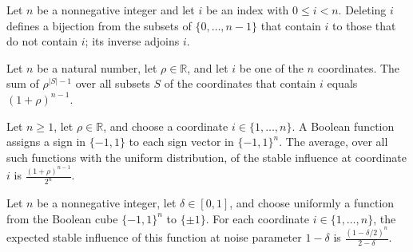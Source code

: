 \begin{definition}
\label{FABL.randomFunctionEraseContainingEquiv}
\leanok
Let $n$ be a nonnegative integer and let $i$ be an index with $0\le i<n$. Deleting $i$
defines a bijection from the subsets of $\{0,\ldots,n-1\}$ that contain $i$ to those
that do not contain $i$; its inverse adjoins $i$.
\end{definition}

\begin{theorem}
\label{FABL.sum_pow_card_sub_one_filter_mem}
\leanok
{}
Let $n$ be a natural number, let $\rho\in\mathbb R$, and let $i$ be one of the $n$
coordinates. The sum of $\rho^{|S|-1}$ over all subsets $S$ of the coordinates that
contain $i$ equals $(1+\rho)^{n-1}$.
\end{theorem}

\begin{theorem}
\label{FABL.pmfExpectation_uniformBooleanFunction_stableInfluence}
\leanok
{}
Let $n\ge 1$, let $\rho\in\mathbb{R}$, and choose a coordinate $i\in\{1,\ldots,n\}$. A
Boolean function assigns a sign in $\{-1,1\}$ to each sign vector in $\{-1,1\}^n$. The
average, over all such functions with the uniform distribution, of the stable influence
at coordinate $i$ is $\frac{(1+\rho)^{n-1}}{2^n}$.
\end{theorem}

\begin{theorem}
\label{FABL.pmfExpectation_uniformBooleanFunction_stableInfluence_one_sub}
\leanok
{}
Let $n$ be a nonnegative integer, let $\delta\in[0,1]$, and choose uniformly a function
from the Boolean cube $\{-1,1\}^n$ to $\{\pm1\}$. For each coordinate
$i\in\{1,\ldots,n\}$, the expected stable influence of this function at noise parameter
$1-\delta$ is $\frac{(1-\delta/2)^n}{2-\delta}$.
\end{theorem}
